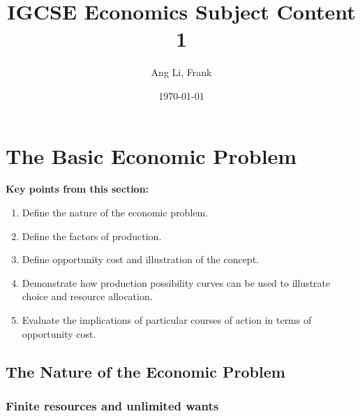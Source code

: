\documentclass[11pt, a4paper, openany]{book}
\title{\textbf{IGCSE Economics Subject Content 1}}
\author{Ang Li, Frank}
\date{\today}
\begin{document}
\newcommand{\head}[1]{\textnormal{\textbf{#1}}}

\fancyhf{}
\renewcommand{\headrulewidth}{2pt}
\renewcommand{\footrulewidth}{1pt}
\fancyhead[LE]{\leftmark}
\fancyhead[RO]{\nouppercase{\rightmark}}
\fancyfoot[LE, RO]{\thepage}

\maketitle
\tableofcontents

\chapter{The Basic Economic Problem}

\begin{tcolorbox}
\textbf{Key points from this section:}
\begin{enumerate}\itemsep0em
	\item Define the nature of the economic problem.
	\item Define the factors of production.
	\item Define opportunity cost and illustration of the concept.
	\item Demonstrate how production possibility curves can be used to illustrate choice and resource allocation.
	\item Evaluate the implications of particular courses of action in terms of opportunity cost.
\end{enumerate}
\end{tcolorbox}

\section{The Nature of the Economic Problem}

\subsection{Finite resources and unlimited wants}
\end{document}
